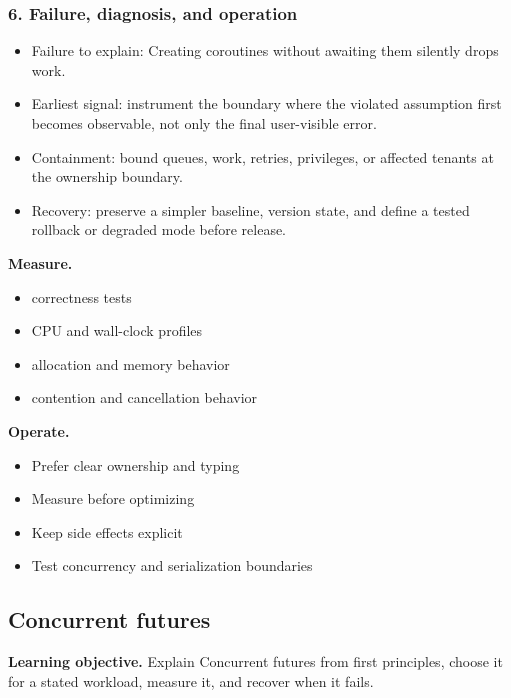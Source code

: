 \subsubsection*{6. Failure, diagnosis, and operation}
\begin{itemize}
\item Failure to explain: Creating coroutines without awaiting them silently drops work.
\item Earliest signal: instrument the boundary where the violated assumption first becomes observable, not only the final user-visible error.
\item Containment: bound queues, work, retries, privileges, or affected tenants at the ownership boundary.
\item Recovery: preserve a simpler baseline, version state, and define a tested rollback or degraded mode before release.
\end{itemize}
\textbf{Measure.}\begin{itemize}
\item correctness tests
\item CPU and wall-clock profiles
\item allocation and memory behavior
\item contention and cancellation behavior
\end{itemize}
\textbf{Operate.}\begin{itemize}
\item Prefer clear ownership and typing
\item Measure before optimizing
\item Keep side effects explicit
\item Test concurrency and serialization boundaries
\end{itemize}
\subsection{Concurrent futures}
\textbf{Learning objective.} Explain Concurrent futures from first principles, choose it for a stated workload, measure it, and recover when it fails.
